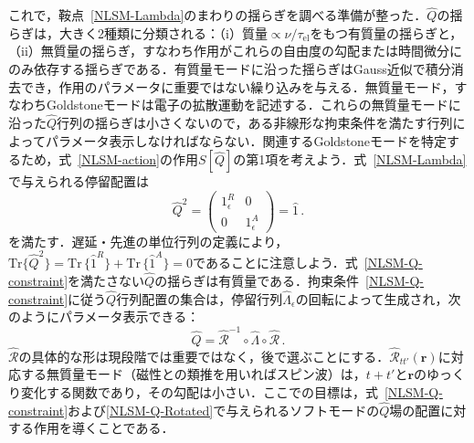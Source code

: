 \documentclass[a4paper,11pt]{ltjsarticle}
\def\Tr{\mathrm{Tr}}
\def\tauel{\tau_{\mathrm{el}}}
\begin{document}
これで，鞍点~\eqref{NLSM-Lambda}のまわりの揺らぎを調べる準備が整った．$\hat{Q}$の揺らぎは，大きく2種類に分類される：（i）質量$\propto
\nu/\tauel$をもつ有質量の揺らぎと，（ii）無質量の揺らぎ，すなわち作用がこれらの自由度の勾配または時間微分にのみ依存する揺らぎである．有質量モードに沿った揺らぎはGauss近似で積分消去でき，作用のパラメータに重要ではない繰り込みを与える．無質量モード，すなわちGoldstoneモードは電子の拡散運動を記述する．これらの無質量モードに沿った$\hat{Q}$行列の揺らぎは小さくないので，ある非線形な拘束条件を満たす行列によってパラメータ表示しなければならない．関連するGoldstoneモードを特定するため，式~\eqref{NLSM-action}の作用$S[\hat Q]$の第1項を考えよう．式~\eqref{NLSM-Lambda}で与えられる停留配置は
\begin{equation}\label{NLSM-Q-constraint}
\hat{Q}^{2}=\left(\begin{array}{cc}1^{R}_{\epsilon} & 0
\\ 0 & 1^{A}_{\epsilon}\end{array}\right)=\hat{1}\,.
\end{equation}
を満たす．遅延・先進の単位行列の定義により，$\Tr\big\{\hat{Q}^{2}\big\}=\Tr\,\{\hat{1}^R\}+
\Tr\,\{\hat{1}^A\}=0$であることに注意しよう．式~\eqref{NLSM-Q-constraint}を満たさない$\hat{Q}$の揺らぎは有質量である．拘束条件~\eqref{NLSM-Q-constraint}に従う$\hat{Q}$行列配置の集合は，停留行列$\hat{\Lambda}_{\epsilon}$の回転によって生成され，次のようにパラメータ表示できる：
\begin{equation}\label{NLSM-Q-Rotated}
\hat{Q}=\hat{\mathcal{R}}^{-1}\circ
\hat{\Lambda}\circ\hat{\mathcal{R}}\,.
\end{equation}
$\hat{\mathcal{R}}$の具体的な形は現段階では重要ではなく，後で選ぶことにする．$\hat{\mathcal{R}}_{tt'}(\mathbf{r})$に対応する無質量モード（磁性との類推を用いればスピン波）は，$t+t'$と$\mathbf{r}$のゆっくり変化する関数であり，その勾配は小さい．ここでの目標は，式~\eqref{NLSM-Q-constraint}および\eqref{NLSM-Q-Rotated}で与えられるソフトモードの$\hat{Q}$場の配置に対する作用を導くことである．
\end{document}
